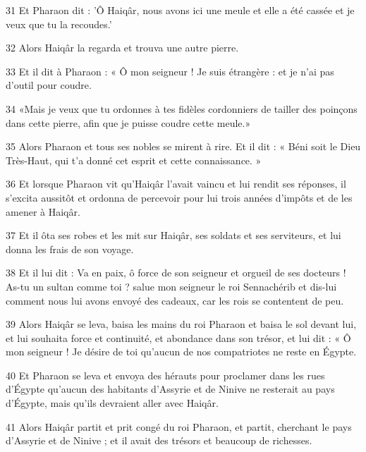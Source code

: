 \par 31 Et Pharaon dit : 'Ô Haiqâr, nous avons ici une meule et elle a été cassée et je veux que tu la recoudes.'

\par 32 Alors Haiqâr la regarda et trouva une autre pierre.

\par 33 Et il dit à Pharaon : « Ô mon seigneur ! Je suis étrangère : et je n'ai pas d'outil pour coudre.

\par 34 «Mais je veux que tu ordonnes à tes fidèles cordonniers de tailler des poinçons dans cette pierre, afin que je puisse coudre cette meule.»

\par 35 Alors Pharaon et tous ses nobles se mirent à rire. Et il dit : « Béni soit le Dieu Très-Haut, qui t'a donné cet esprit et cette connaissance. »

\par 36 Et lorsque Pharaon vit qu'Haiqâr l'avait vaincu et lui rendit ses réponses, il s'excita aussitôt et ordonna de percevoir pour lui trois années d'impôts et de les amener à Haiqâr.

\par 37 Et il ôta ses robes et les mit sur Haiqâr, ses soldats et ses serviteurs, et lui donna les frais de son voyage.

\par 38 Et il lui dit : Va en paix, ô force de son seigneur et orgueil de ses docteurs ! As-tu un sultan comme toi ? salue mon seigneur le roi Sennachérib et dis-lui comment nous lui avons envoyé des cadeaux, car les rois se contentent de peu.

\par 39 Alors Haiqâr se leva, baisa les mains du roi Pharaon et baisa le sol devant lui, et lui souhaita force et continuité, et abondance dans son trésor, et lui dit : « Ô mon seigneur ! Je désire de toi qu'aucun de nos compatriotes ne reste en Égypte.

\par 40 Et Pharaon se leva et envoya des hérauts pour proclamer dans les rues d'Égypte qu'aucun des habitants d'Assyrie et de Ninive ne resterait au pays d'Égypte, mais qu'ils devraient aller avec Haiqâr.

\par 41 Alors Haiqâr partit et prit congé du roi Pharaon, et partit, cherchant le pays d'Assyrie et de Ninive ; et il avait des trésors et beaucoup de richesses.

